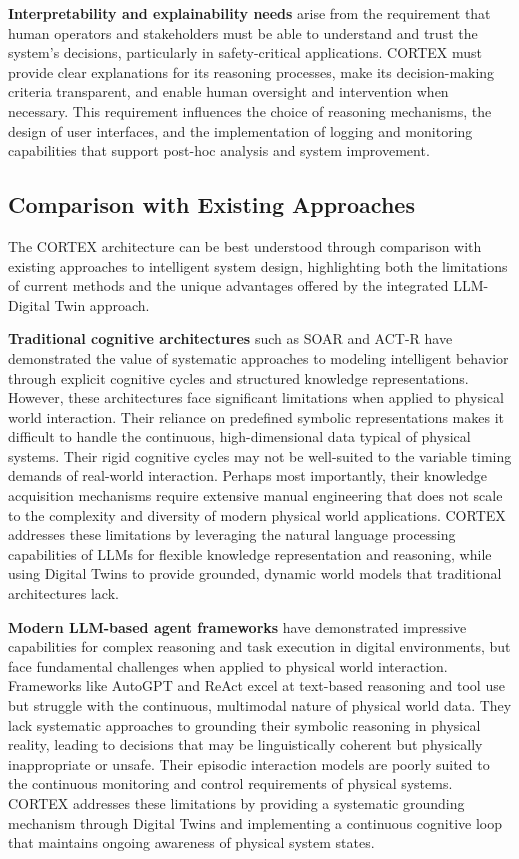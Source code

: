 \textbf{Interpretability and explainability needs} arise from the requirement that human operators and stakeholders must be able to understand and trust the system's decisions, particularly in safety-critical applications. CORTEX must provide clear explanations for its reasoning processes, make its decision-making criteria transparent, and enable human oversight and intervention when necessary. This requirement influences the choice of reasoning mechanisms, the design of user interfaces, and the implementation of logging and monitoring capabilities that support post-hoc analysis and system improvement.

\subsection{Comparison with Existing Approaches}

The CORTEX architecture can be best understood through comparison with existing approaches to intelligent system design, highlighting both the limitations of current methods and the unique advantages offered by the integrated LLM-Digital Twin approach.

\textbf{Traditional cognitive architectures} such as SOAR and ACT-R have demonstrated the value of systematic approaches to modeling intelligent behavior through explicit cognitive cycles and structured knowledge representations. However, these architectures face significant limitations when applied to physical world interaction. Their reliance on predefined symbolic representations makes it difficult to handle the continuous, high-dimensional data typical of physical systems. Their rigid cognitive cycles may not be well-suited to the variable timing demands of real-world interaction. Perhaps most importantly, their knowledge acquisition mechanisms require extensive manual engineering that does not scale to the complexity and diversity of modern physical world applications. CORTEX addresses these limitations by leveraging the natural language processing capabilities of LLMs for flexible knowledge representation and reasoning, while using Digital Twins to provide grounded, dynamic world models that traditional architectures lack.

\textbf{Modern LLM-based agent frameworks} have demonstrated impressive capabilities for complex reasoning and task execution in digital environments, but face fundamental challenges when applied to physical world interaction. Frameworks like AutoGPT and ReAct excel at text-based reasoning and tool use but struggle with the continuous, multimodal nature of physical world data. They lack systematic approaches to grounding their symbolic reasoning in physical reality, leading to decisions that may be linguistically coherent but physically inappropriate or unsafe. Their episodic interaction models are poorly suited to the continuous monitoring and control requirements of physical systems. CORTEX addresses these limitations by providing a systematic grounding mechanism through Digital Twins and implementing a continuous cognitive loop that maintains ongoing awareness of physical system states.

